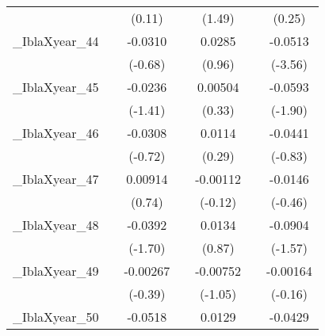 {\begin{tabular}{l*{6}{c}}
            &                     &      (0.11)         &                     &      (1.49)         &                     &      (0.25)         \\
[1em]
\_IblaXyear\_44&                     &     -0.0310         &                     &      0.0285         &                     &     -0.0513\sym{**} \\
            &                     &     (-0.68)         &                     &      (0.96)         &                     &     (-3.56)         \\
[1em]
\_IblaXyear\_45&                     &     -0.0236         &                     &     0.00504         &                     &     -0.0593         \\
            &                     &     (-1.41)         &                     &      (0.33)         &                     &     (-1.90)         \\
[1em]
\_IblaXyear\_46&                     &     -0.0308         &                     &      0.0114         &                     &     -0.0441         \\
            &                     &     (-0.72)         &                     &      (0.29)         &                     &     (-0.83)         \\
[1em]
\_IblaXyear\_47&                     &     0.00914         &                     &    -0.00112         &                     &     -0.0146         \\
            &                     &      (0.74)         &                     &     (-0.12)         &                     &     (-0.46)         \\
[1em]
\_IblaXyear\_48&                     &     -0.0392         &                     &      0.0134         &                     &     -0.0904         \\
            &                     &     (-1.70)         &                     &      (0.87)         &                     &     (-1.57)         \\
[1em]
\_IblaXyear\_49&                     &    -0.00267         &                     &    -0.00752         &                     &    -0.00164         \\
            &                     &     (-0.39)         &                     &     (-1.05)         &                     &     (-0.16)         \\
[1em]
\_IblaXyear\_50&                     &     -0.0518         &                     &      0.0129         &                     &     -0.0429\sym{**} \\

\end{tabular}}
